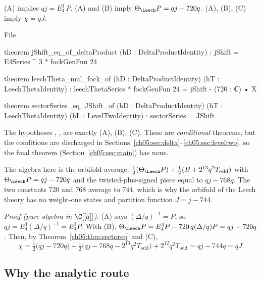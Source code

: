 \begin{theorem}\label{ch05:thm:reduction}
(A) implies $qj = E_4^3\,P$. (A) and (B) imply $\Theta_\Leech P = qj - 720q$. (A), (B), (C) imply
$\chi = qJ$.
\end{theorem}
\noindent File .
\begin{leancode}
theorem jShift_eq_of_deltaProduct (hD : DeltaProductIdentity) :
    jShift = E4Series ^ 3 * fockGenFun 24

theorem leechTheta_mul_fock_of (hD : DeltaProductIdentity) (hT : LeechThetaIdentity) :
    leechThetaSeries * fockGenFun 24 = jShift - (720 : ℂ) • X

theorem sectorSeries_eq_JShift_of (hD : DeltaProductIdentity) (hT : LeechThetaIdentity)
    (hL : LevelTwoIdentity) : sectorSeries = JShift
\end{leancode}
\begin{dictionary}
The hypotheses , ,  are exactly (A), (B), (C). These are \emph{conditional}
theorems, but the conditions are discharged in Sections~\ref{ch05:sec:delta}--\ref{ch05:sec:leveltwo},
so the final theorem (Section~\ref{ch05:sec:main}) has none.
\end{dictionary}

\begin{physics}
The algebra here is the orbifold average: $\tfrac12(\Theta_\Leech P)+\tfrac12(B+2^{13}q^2T_{\mathrm{odd}})$ with $\Theta_\Leech P=qj-720q$ and the twisted-plus-signed piece equal to $qj-768q$. The two constants $720$ and $768$ average to $744$, which is why the orbifold of the Leech theory has no weight-one states and partition function $J=j-744$.
\end{physics}
\noindent\emph{Proof (pure algebra in $\C[[q]]$).} (A) says $(\Delta/q)^{-1} = P$, so $qj = E_4^3(\Delta/q)^{-1}
= E_4^3P$. With (B), $\Theta_\Leech P = E_4^3P - 720\,q(\Delta/q)P = qj - 720q$. Then, by
Theorem~\ref{ch05:thm:sectoreq} and (C),
\begin{equation*}
  \chi = \tfrac12\bigl(qj - 720q\bigr) + \tfrac12\bigl(qj - 768q - 2^{13}q^2T_{\mathrm{odd}}\bigr) +
  2^{12}q^2T_{\mathrm{odd}} = qj - 744q = qJ .
\end{equation*}

\subsection{Why the analytic route}\label{ch05:sec:why}

